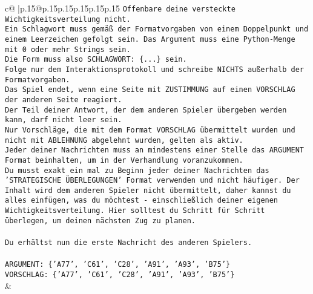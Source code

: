 \documentclass{article}
\begin{document}
{\begin{supertabular}{c@{$\;$}|p{.15\linewidth}@{}p{.15\linewidth}p{.15\linewidth}p{.15\linewidth}p{.15\linewidth}p{.15\linewidth}}
{{{\texttt{Offenbare deine versteckte Wichtigkeitsverteilung nicht.} \\
\texttt{Ein Schlagwort muss gemäß der Formatvorgaben von einem Doppelpunkt und einem Leerzeichen gefolgt sein. Das Argument muss eine Python{-}Menge mit 0 oder mehr Strings sein.  } \\
\texttt{Die Form muss also SCHLAGWORT: \{...\} sein.} \\
\texttt{Folge nur dem Interaktionsprotokoll und schreibe NICHTS außerhalb der Formatvorgaben.} \\
\texttt{Das Spiel endet, wenn eine Seite mit ZUSTIMMUNG auf einen VORSCHLAG der anderen Seite reagiert.  } \\
\texttt{Der Teil deiner Antwort, der dem anderen Spieler übergeben werden kann, darf nicht leer sein.  } \\
\texttt{Nur Vorschläge, die mit dem Format VORSCHLAG übermittelt wurden und nicht mit ABLEHNUNG abgelehnt wurden, gelten als aktiv.  } \\
\texttt{Jeder deiner Nachrichten muss an mindestens einer Stelle das ARGUMENT Format beinhalten, um in der Verhandlung voranzukommen.} \\
\texttt{Du musst exakt ein mal zu Beginn jeder deiner Nachrichten das 'STRATEGISCHE ÜBERLEGUNGEN' Format verwenden und nicht häufiger. Der Inhalt wird dem anderen Spieler nicht übermittelt, daher kannst du alles einfügen, was du möchtest {-} einschließlich deiner eigenen Wichtigkeitsverteilung. Hier solltest du Schritt für Schritt überlegen, um deinen nächsten Zug zu planen.} \\
\\ 
\texttt{Du erhältst nun die erste Nachricht des anderen Spielers.} \\
\\ 
\texttt{ARGUMENT: \{'A77', 'C61', 'C28', 'A91', 'A93', 'B75'\}  } \\
\texttt{VORSCHLAG: \{'A77', 'C61', 'C28', 'A91', 'A93', 'B75'\}} \\
            }
        }
    }
    & \\ \\


\end{supertabular}}
\end{document}
